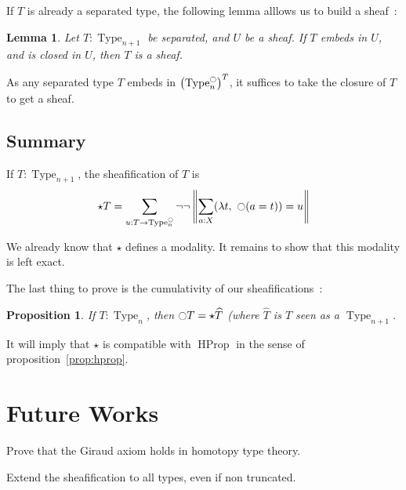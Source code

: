 \documentclass[conference]{IEEEtran}
\newtheorem{prop}[thm]{Proposition}
\newtheorem{lem}[thm]{Lemma}
\DeclareMathOperator{\Type}{Type}
\DeclareMathOperator{\HProp}{HProp}
\newcommand{\modal}{\ensuremath{\ocircle}}
\begin{document}
If $T$ is already a separated type, the following lemma alllows us
to build a sheaf~:
\begin{lem}
  Let $T:\Type_{n+1}$ be separated, and $U$ be a sheaf. If $T$ embeds
  in $U$, and is closed in $U$, then $T$ is a sheaf.
\end{lem}

As any separated type $T$ embeds in $\left(\Type_n^\modal\right)^T$,
it suffices to take the closure of $T$ to get a sheaf.

\subsection{Summary}
\label{ssec:summary}

If $T:\Type_{n+1}$, the sheafification of $T$ is
$$\star T = \sum_{u:T \to \Type_n^\modal} \lnot\lnot\left\| \sum_{a:X} 
            (\lambda t,~\modal (a=t)) = u\right\|$$

We already know that $\star$ defines a modality. It remains to show
that this modality is left exact.

The last thing to prove is the cumulativity of our sheafifications~:
\begin{prop}
  If $T:\Type_n$, then $\modal T = \star \widehat T$ (where $\widehat
  T$ is $T$ seen as a $\Type_{n+1}$.
\end{prop}
It will imply that $\star$ is compatible with $\HProp$ in the sense of proposition~\ref{prop:hprop}.
\section{Future Works}
\label{sec:future-works}

Prove that the Giraud axiom holds in homotopy type theory.

Extend the sheafification to all types, even if non truncated.



%
%
\end{document}
